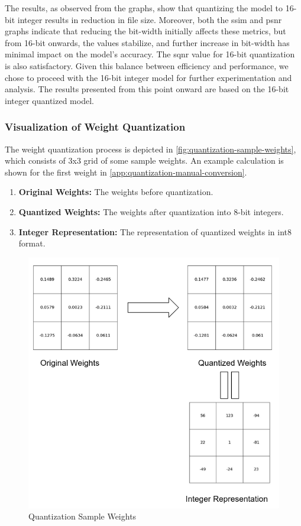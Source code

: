     The results, as observed from the graphs, show that quantizing the model to 16-bit integer results in reduction in file size. Moreover, both the \gls{ssim} and \gls{psnr} graphs indicate that reducing the bit-width initially affects these metrics, but from 16-bit onwards, the values stabilize, and further increase in bit-width has minimal impact on the model's accuracy. The \gls{sqnr} value for 16-bit quantization is also satisfactory. Given this balance between efficiency and performance, we chose to proceed with the 16-bit integer model for further experimentation and analysis. The results presented from this point onward are based on the 16-bit integer quantized model.

    \subsubsection{Visualization of Weight Quantization}
    The weight quantization process is depicted in \autoref{fig:quantization-sample-weights}, which consists of 3x3 grid of some sample weights. An example calculation is shown for the first weight in \autoref{app:quantization-manual-conversion}.
    \begin{enumerate}[label=\textbf{\roman*.}]
        \item \textbf{Original Weights:} The weights before quantization.
        \item \textbf{Quantized Weights:} The weights after quantization into 8-bit integers.
        \item \textbf{Integer Representation:} The representation of quantized weights in int8 format.
    \end{enumerate}

    \begin{figure}[H]
        \centering
        \includegraphics[width=0.8\linewidth]{assets/quantization/quantization_sample_weights.png}
        \caption{Quantization Sample Weights}
        \label{fig:quantization-sample-weights}
    \end{figure}

